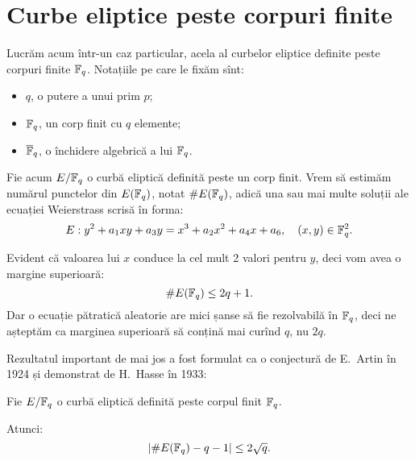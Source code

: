 
\chapter{Curbe eliptice peste corpuri finite}

Lucrăm acum într-un caz particular, acela al curbelor eliptice definite
peste corpuri finite $ \mathbb{F}_q $. Notațiile pe care le fixăm sînt:
\begin{itemize}
\item $ q $, o putere a unui prim $ p $;
\item $ \mathbb{F}_q $, un corp finit cu $ q $ elemente;
\item $ \overline{\mathbb{F}}_q $, o închidere algebrică a lui $ \mathbb{F}_q $.
\end{itemize}

Fie acum $ E/\mathbb{F}_q $ o curbă eliptică definită peste un corp finit.
Vrem să estimăm numărul punctelor din $ E(\mathbb{F}_q) $, notat $ \# E(\mathbb{F}_q) $,
adică una sau mai multe soluții ale ecuației Weierstrass scrisă în forma:
\[
  E : y^2 + a_1 xy + a_3 y = x^3 + a_2 x^2 + a_4 x + a_6, \quad %
  (x, y) \in \FF_q^2.
\]

Evident că valoarea lui $ x $ conduce la cel mult 2 valori pentru $ y $,
deci vom avea o margine superioară:
\[
  \# E(\mathbb{F}_q) \leq 2q + 1.
\]
Dar o ecuație pătratică aleatorie are mici șanse să fie rezolvabilă
în $ \mathbb{F}_q $, deci ne așteptăm ca marginea superioară să conțină mai curînd
$ q $, nu $ 2q $.

Rezultatul important de mai jos a fost formulat ca o conjectură de E.\ Artin
în 1924 și demonstrat de H.\ Hasse în 1933:
\begin{theorem}[Hasse]\label{thm:hasse}
  Fie $ E/\mathbb{F}_q $ o curbă eliptică definită peste corpul finit $ \mathbb{F}_q $.

  Atunci:
  \[
    \left| \# E(\mathbb{F}_q) - q - 1 \right| \leq 2 \sqrt{q}.
  \]
\end{theorem}


